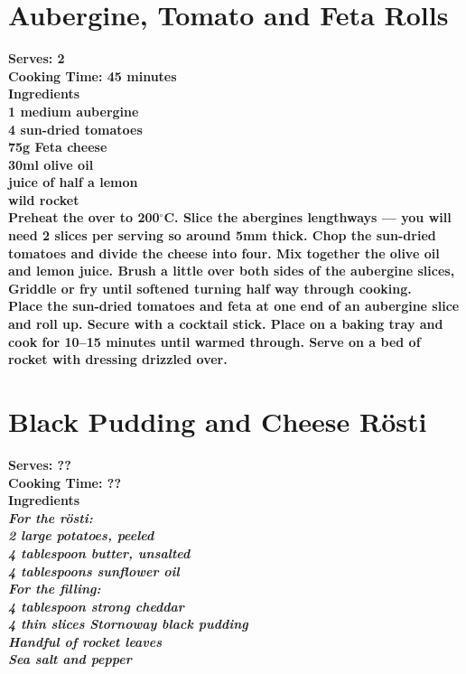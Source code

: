\documentclass[18pt, oneside]{book}
\begin{document}
\section{Aubergine, Tomato and Feta Rolls}
\bf{Serves: 2} \\
\bf{Cooking Time: 45 minutes} \\

\bf{Ingredients} \normalfont \\
1 medium aubergine \\
4 sun-dried tomatoes \\
75g Feta cheese \\
30ml olive oil \\
juice of half a lemon \\
wild rocket \\

Preheat the over to 200$^{\circ}$C. Slice the abergines lengthways --- you will need 2 slices per serving so around 5mm thick. Chop the sun-dried tomatoes and divide the cheese into four. Mix together the olive oil and lemon juice. Brush a little over both sides of the aubergine slices, Griddle or fry until softened turning half way through cooking. \\

Place the sun-dried tomatoes and feta at one end of an aubergine slice and roll up. Secure with a cocktail stick. Place on a baking tray and cook for 10--15 minutes until warmed through. Serve on a bed of rocket with dressing drizzled over. 


\section{Black Pudding and Cheese R\"{o}sti}
\bf{Serves: ??} \\
\bf{Cooking Time: ??} \\

\bf{Ingredients} \normalfont \\
\it{For the r\"{o}sti}: \normalfont \\
2 large potatoes, peeled \\
4 tablespoon butter, unsalted \\
4 tablespoons sunflower oil \\

\it{For the filling}: \normalfont \\
4 tablespoon strong cheddar \\
4 thin slices Stornoway black pudding \\
Handful of rocket leaves \\
Sea salt and pepper \\
\end{document}

